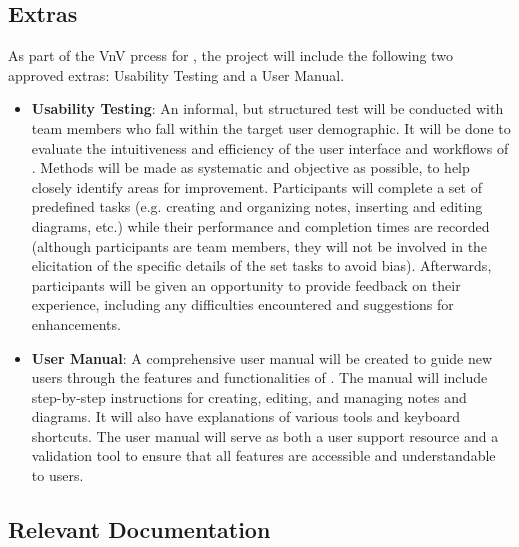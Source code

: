 \documentclass[12pt, titlepage]{article}
\begin{document}
\subsection{Extras}


\noindent As part of the VnV prcess for \progname{}, the project will include the
following two approved extras: Usability Testing and a User Manual.

\begin{itemize}
  \item \textbf{Usability Testing}: An informal, but structured test will be
  conducted with team members who fall within the target user demographic. It
  will be done to evaluate the intuitiveness and efficiency of the user interface
  and workflows of \progname{}. Methods will be made as systematic and objective
  as possible, to help closely identify areas for improvement. Participants will
  complete a set of predefined tasks (e.g. creating and organizing notes, inserting
  and editing diagrams, etc.) while their performance and completion times are
  recorded (although participants are team members, they will not be involved in
  the elicitation of the specific details of the set tasks to avoid bias).
  Afterwards, participants will be given an opportunity to provide feedback on
  their experience, including any difficulties encountered and suggestions for
  enhancements.
  \item \textbf{User Manual}: A comprehensive user manual will be created to
  guide new users through the features and functionalities of \progname{}. The
  manual will include step-by-step instructions for creating, editing, and
  managing notes and diagrams. It will also have explanations of various tools
  and keyboard shortcuts. The user manual will serve as both a user support
  resource and a validation tool to ensure that all features are accessible and
  understandable to users.
\end{itemize}

\subsection{Relevant Documentation}
\end{document}
